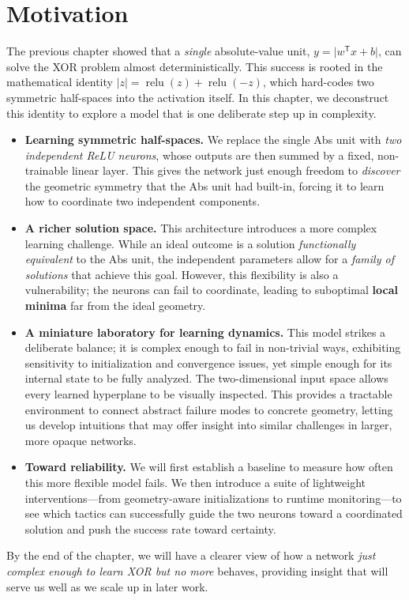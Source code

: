 \section{Motivation}
\label{sec:relu1-motivation}

The previous chapter showed that a \emph{single} absolute-value unit, \(y=\lvert w^{\mathsf T} x + b\rvert\), can solve the XOR problem almost deterministically. This success is rooted in the mathematical identity \(\lvert z\rvert=\operatorname{relu}(z)+\operatorname{relu}(-z)\), which hard-codes two symmetric half-spaces into the activation itself. In this chapter, we deconstruct this identity to explore a model that is one deliberate step up in complexity.

\begin{itemize}
    \item \textbf{Learning symmetric half-spaces.}
        We replace the single Abs unit with \emph{two independent ReLU neurons}, whose outputs are then summed by a fixed, non-trainable linear layer. This gives the network just enough freedom to \emph{discover} the geometric symmetry that the Abs unit had built-in, forcing it to learn how to coordinate two independent components.

    \item \textbf{A richer solution space.}
        This architecture introduces a more complex learning challenge. While an ideal outcome is a solution \emph{functionally equivalent} to the Abs unit, the independent parameters allow for a \emph{family of solutions} that achieve this goal. However, this flexibility is also a vulnerability; the neurons can fail to coordinate, leading to suboptimal \textbf{local minima} far from the ideal geometry.

    \item \textbf{A miniature laboratory for learning dynamics.}
        This model strikes a deliberate balance; it is complex enough to fail in non-trivial ways, exhibiting sensitivity to initialization and convergence issues, yet simple enough for its internal state to be fully analyzed. The two-dimensional input space allows every learned hyperplane to be visually inspected. This provides a tractable environment to connect abstract failure modes to concrete geometry, letting us develop intuitions that may offer insight into similar challenges in larger, more opaque networks.
    \item \textbf{Toward reliability.}
        We will first establish a baseline to measure how often this more flexible model fails. We then introduce a suite of lightweight interventions—from geometry-aware initializations to runtime monitoring—to see which tactics can successfully guide the two neurons toward a coordinated solution and push the success rate toward certainty.
\end{itemize}

By the end of the chapter, we will have a clearer view of how a network \emph{just complex enough to learn XOR but no more} behaves, providing insight that will serve us well as we scale up in later work.